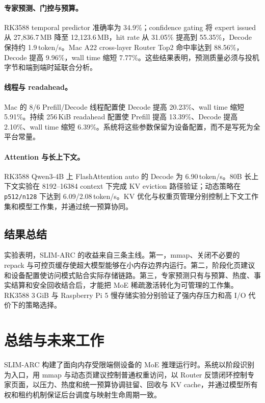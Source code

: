 \documentclass[a4paper]{article}
\begin{document}
\paragraph{专家预测、门控与预算。}
RK3588 temporal predictor 准确率为 34.9\%；confidence gating 将 expert issued 从 27,836.7\,MB 降至 12,123.6\,MB，hit rate 从 31.05\% 提高到 55.35\%，Decode 保持约 1.9\,token/s。Mac A22 cross-layer Router Top2 命中率达到 88.56\%，Decode 提高 9.96\%，wall time 缩短 7.77\%。这些结果表明，预测质量必须与投机字节和端到端时延联合分析。

\paragraph{线程与 readahead。}
Mac 的 8/6 Prefill/Decode 线程配置使 Decode 提高 20.23\%、wall time 缩短 5.91\%。持续 256\,KiB readahead 配置使 Prefill 提高 13.39\%、Decode 提高 2.10\%、wall time 缩短 6.39\%。系统将这些参数保留为设备配置，而不是写死为全平台常量。

\paragraph{Attention 与长上下文。}
RK3588 Qwen3-4B 上 FlashAttention auto 的 Decode 为 6.90\,token/s。80B 长上下文实验在 8192--16384 context 下完成 KV eviction 路径验证；动态策略在 \texttt{p512/n128} 下达到 6.09/2.08\,token/s。KV 优化与权重页管理分别控制上下文工作集和模型工作集，并通过统一预算协同。

\subsection{结果总结}

实验表明，SLIM-ARC 的收益来自三条主线。第一，mmap、关闭不必要的 repack 与可控页缓存使超大模型能够在小内存边界内运行。第二，阶段化页建议和设备配置使访问模式贴合实际存储链路。第三，专家预测只有与预算、热度、事实结算和安全回收结合后，才能把 MoE 稀疏激活转化为可管理的工作集。RK3588 3\,GiB 与 Raspberry Pi 5 慢存储实验分别验证了强内存压力和高 I/O 代价下的策略选择。

\newpage
\section{总结与未来工作}

SLIM-ARC 构建了面向内存受限端侧设备的 MoE 推理运行时。系统以阶段识别为入口，用 mmap 与动态页建议控制普通权重访问，以 Router 反馈闭环控制专家页面，以压力、热度和统一预算协调驻留、回收与 KV cache，并通过模型所有权和租约机制保证后台调度与映射生命周期一致。
\end{document}
